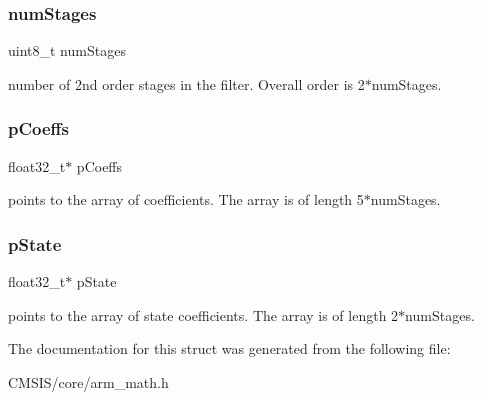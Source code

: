 \subsubsection{\texorpdfstring{num\+Stages}{numStages}}
{\footnotesize\ttfamily uint8\+\_\+t num\+Stages}

number of 2nd order stages in the filter. Overall order is 2$\ast$num\+Stages. \mbox{\label{structarm__biquad__cascade__df2_t__instance__f32_aacbb8dd8eeba4b21fc2bb40076405ee3}} 
\subsubsection{\texorpdfstring{p\+Coeffs}{pCoeffs}}
{\footnotesize\ttfamily float32\+\_\+t$\ast$ p\+Coeffs}

points to the array of coefficients. The array is of length 5$\ast$num\+Stages. \mbox{\label{structarm__biquad__cascade__df2_t__instance__f32_a335c87e6fdc4b96601d95a5de8b9c463}} 
\subsubsection{\texorpdfstring{p\+State}{pState}}
{\footnotesize\ttfamily float32\+\_\+t$\ast$ p\+State}

points to the array of state coefficients. The array is of length 2$\ast$num\+Stages. 

The documentation for this struct was generated from the following file\+:\begin{DoxyCompactItemize}
\item 
C\+M\+S\+I\+S/core/arm\+\_\+math.\+h\end{DoxyCompactItemize}
